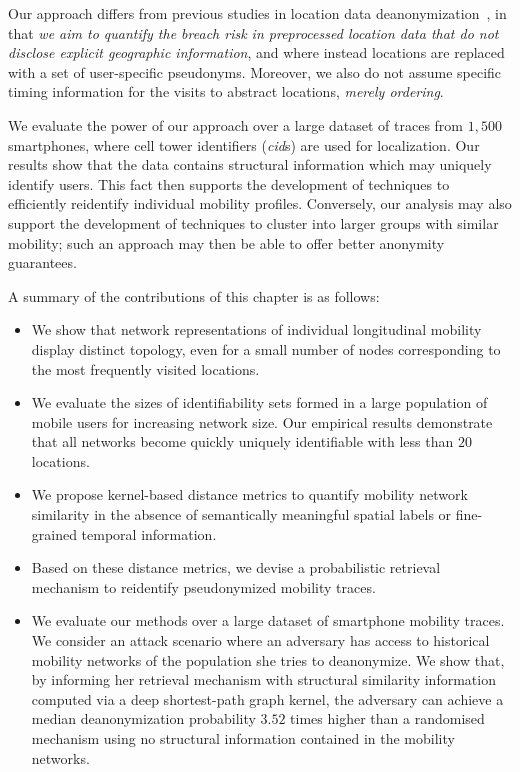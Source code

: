 Our approach differs from previous studies in location data deanonymization~\citep{Gambs2014, deMulder08, Naini2016a, Golle2009}, in that \emph{we aim to quantify the breach risk in preprocessed location data that do not disclose explicit geographic information}, and where instead locations are replaced with a set of user-specific pseudonyms.
Moreover, we also do not assume specific timing information for the visits to abstract locations, \emph{merely ordering}.

We evaluate the power of our approach over a large dataset of traces from $1,500$ smartphones, where cell tower identifiers (\emph{cid}s) are used for localization.
Our results show that the data contains structural information which may uniquely identify users.
This fact then supports the development of techniques to efficiently reidentify individual mobility profiles.
Conversely, our analysis may also support the development of techniques to cluster into larger groups with similar mobility; such an approach may then be able to offer better anonymity guarantees.

A summary of the contributions of this chapter is as follows:

\begin{itemize}

\item We show that network representations of individual longitudinal mobility display distinct topology, even for a small number of nodes corresponding to the most frequently visited locations.

\item We evaluate the sizes of identifiability sets formed in a large population of mobile users for increasing network size.
Our empirical results demonstrate that all networks become quickly uniquely identifiable with less than $20$ locations.

\item We propose kernel-based distance metrics to quantify mobility network similarity in the absence of semantically meaningful spatial labels or fine-grained temporal information.

\item Based on these distance metrics, we devise a probabilistic retrieval mechanism to reidentify pseudonymized mobility traces.

\item We evaluate our methods over a large dataset of smartphone mobility traces. We consider an attack scenario where an adversary has access to historical mobility networks of the population she tries to deanonymize. We show that, by informing her retrieval mechanism with structural similarity information computed via a deep shortest-path graph kernel, the adversary can achieve a median deanonymization probability $3.52$ times higher than a randomised mechanism using no structural information contained in the mobility networks.

\end{itemize}

